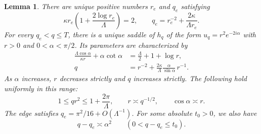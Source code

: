 \documentclass[11pt,reqno]{amsart}
\numberwithin{equation}{section}
\newtheorem{lemma}[theorem]{Lemma}
\begin{document}
\begin{lemma}\label{lem:saddle-parameters}
There are unique positive numbers $r_e$ and $q_e$ satisfying
\begin{equation}\label{eq:edge-definition}
 \kappa r_e\left(1+\frac{2\log r_e}{\Lambda}\right)=2,
 \qquad q_e=r_e^{-2}+\frac{2\kappa}{\Lambda r_e}.
\end{equation}
For every $q_e<q\le T$, there is a unique saddle of $h_q$ of the form
$u_q=r^2e^{-2i\alpha}$ with $r>0$ and $0<\alpha<\pi/2$.
Its parameters are characterized by
\begin{align}
 \frac{\Lambda\cos\alpha}{\kappa r}+\alpha\cot\alpha
  &=\frac\Lambda2+1+\log r,\label{eq:saddle-r}\\
 q&=r^{-2}+\frac{2\kappa}{\Lambda}
                    \frac{\alpha}{\sin\alpha}\,r^{-1}.
                    \label{eq:saddle-q}
\end{align}
As $\alpha$ increases, $r$ decreases strictly and $q$ increases
strictly. The following hold uniformly in this range:
\begin{equation}\label{eq:saddle-comparisons}
 1\le qr^2\le1+\frac{2\pi}{\Lambda},\qquad
 r\asymp q^{-1/2},\qquad \cos\alpha\asymp r.
\end{equation}
The edge satisfies $q_e=\pi^2/16+O(\Lambda^{-1})$.
For some absolute $t_0>0$, we also have
\begin{equation}\label{eq:edge-comparison}
 q-q_e\asymp\alpha^2\qquad(0<q-q_e\le t_0).
\end{equation}
\end{lemma}
\end{document}
